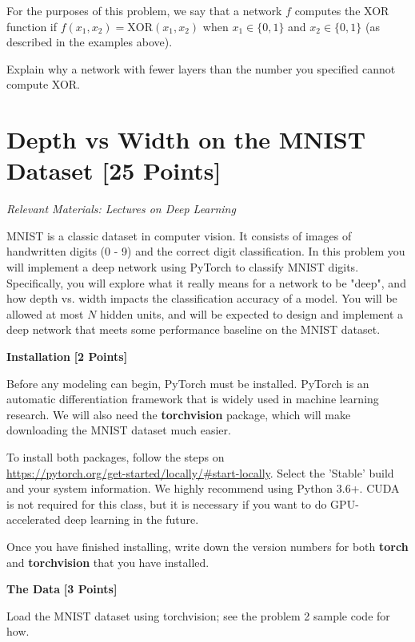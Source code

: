 For the purposes of this problem, we say that a network $f$ computes the XOR function if $f(x_1, x_2) = \text{XOR}(x_1, x_2)$ when $x_1 \in \{0, 1\}$ and $x_2 \in \{0, 1\}$ (as described in the examples above).

Explain why a network with fewer layers than the number you specified cannot compute XOR.



\newpage
\section{Depth vs Width on the MNIST Dataset  [25 Points]}

\textit{Relevant Materials: Lectures on Deep Learning}

MNIST is a classic dataset in computer vision. It consists of images of handwritten digits (0 - 9) and the correct digit classification. In this problem you will implement a deep network using PyTorch to classify MNIST digits. Specifically, you will explore what it really means for a network to be "deep", and how depth vs. width impacts the classification accuracy of a model. You will be allowed at most $N$ hidden units, and will be expected to design and implement a deep network that meets some performance baseline on the MNIST dataset.

\medskip

\problem \textbf{Installation} \textbf{[2 Points]}


Before any modeling can begin, PyTorch must be installed. PyTorch is an automatic differentiation framework that is widely used in machine learning research.  We will also need the \textbf{torchvision} package, which will make downloading the MNIST dataset much easier. 

To install both packages, follow the steps on \\
\url{https://pytorch.org/get-started/locally/#start-locally}. Select the 'Stable' build and your system information. We highly recommend using Python 3.6+. CUDA is not required for this class, but it is necessary if you want to do GPU-accelerated deep learning in the future.

Once you have finished installing, write down the version numbers for both \textbf{torch} and \textbf{torchvision} that you have installed.


\problem \textbf{The Data} \textbf{[3 Points]}

Load the MNIST dataset using torchvision; see the problem 2 sample code for how.

